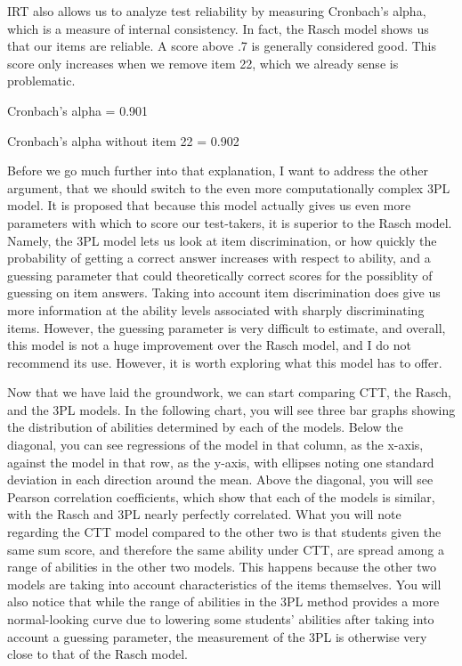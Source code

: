 \documentclass{article}\usepackage[]{graphicx}\usepackage[]{color}
\begin{document}
\begin{enumerate}
IRT also allows us to analyze test reliability by measuring Cronbach's alpha, which is a measure of internal consistency. In fact, the Rasch model shows us that our items are reliable. A score above .7 is generally considered good. This score only increases when we remove item 22, which we already sense is problematic.

\centering

\raggedright
Cronbach's alpha = 0.901 %

Cronbach's alpha without item 22 = 0.902
\raggedright

Before we go much further into that explanation, I want to address the other argument, that we should switch to the even more computationally complex 3PL model. It is proposed that because this model actually gives us even more parameters with which to score our test-takers, it is superior to the Rasch model. Namely, the 3PL model lets us look at item discrimination, or how quickly the probability of getting a correct answer increases with respect to ability, and a guessing parameter that could theoretically correct scores for the possiblity of guessing on item answers. Taking into account item discrimination does give us more information at the ability levels associated with sharply discriminating items. However, the guessing parameter is very difficult to estimate, and overall, this model is not a huge improvement over the Rasch model, and I do not recommend its use. However, it is worth exploring what this model has to offer.

Now that we have laid the groundwork, we can start comparing CTT, the Rasch, and the 3PL models. In the following chart, you will see three bar graphs showing the distribution of abilities determined by each of the models. Below the diagonal, you can see regressions of the model in that column, as the x-axis, against the model in that row, as the y-axis, with ellipses noting one standard deviation in each direction around the mean. Above the diagonal, you will see Pearson correlation coefficients, which show that each of the models is similar, with the Rasch and 3PL nearly perfectly correlated. What you will note regarding the CTT model compared to the other two is that students given the same sum score, and therefore the same ability under CTT, are spread among a range of abilities in the other two models. This happens because the other two models are taking into account characteristics of the items themselves. You will also notice that while the range of abilities in the 3PL method provides a more normal-looking curve due to lowering some students' abilities after taking into account a guessing parameter, the measurement of the 3PL is otherwise very close to that of the Rasch model.


\end{enumerate}
\end{document}
